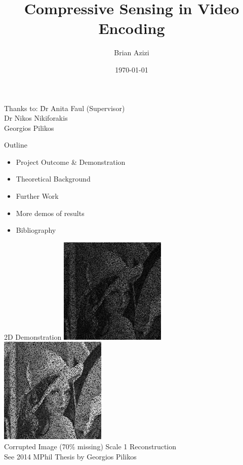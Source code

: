 \documentclass[xcolor=table]{beamer}
\title[Beamer Intro]{Compressive Sensing in Video Encoding}
\author{Brian Azizi}
\institute[LSC]{Laboratory for Scientific Computing, University of Cambridge}
\date{\today}
\numberwithin{equation}{section}
\begin{document}
\begin{frame}
  \titlepage
  \begin{tabbing}
    Thanks to:  \= Dr Anita Faul (Supervisor)\\
    \>Dr Nikos Nikiforakis\\
    \>Georgios Pilikos
  \end{tabbing}
\end{frame}

\begin{frame}{Outline}
\begin{itemize}
\item Project Outcome \& Demonstration
\item Theoretical Background
\item Further Work 
\item More demos of results
\item Bibliography
\end{itemize}
\end{frame}

\begin{frame}{2D Demonstration}
\includegraphics[width=2in,height=2in]{L0.png}
\hspace{0.2in}
\includegraphics[width=2in,height=2in]{L1.png}\\
\hspace{0in} Corrupted Image (70\% missing) \hspace{0.5in} Scale 1 Reconstruction\\
\vspace{0.2in}
See 2014 MPhil Thesis by Georgios Pilikos
\end{frame}
\end{document}
